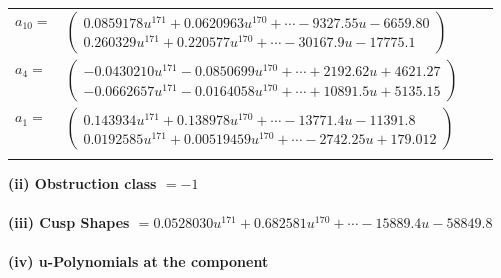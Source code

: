 \documentclass[1p]{elsarticle_modified}
\theoremstyle{definition}
\begin{document}
\begin{tabular}{m{7pt} m{180pt} m{7pt} m{180pt} }
\flushright $a_{10}=$&$\begin{pmatrix}0.0859178 u^{171}+0.0620963 u^{170}+\cdots-9327.55 u-6659.80\\0.260329 u^{171}+0.220577 u^{170}+\cdots-30167.9 u-17775.1\end{pmatrix}$ \\
\flushright $a_{4}=$&$\begin{pmatrix}-0.0430210 u^{171}-0.0850699 u^{170}+\cdots+2192.62 u+4621.27\\-0.0662657 u^{171}-0.0164058 u^{170}+\cdots+10891.5 u+5135.15\end{pmatrix}$ \\
\flushright $a_{1}=$&$\begin{pmatrix}0.143934 u^{171}+0.138978 u^{170}+\cdots-13771.4 u-11391.8\\0.0192585 u^{171}+0.00519459 u^{170}+\cdots-2742.25 u+179.012\end{pmatrix}$\\&\end{tabular}
\flushleft \textbf{(ii) Obstruction class $= -1$}\\~\\
\flushleft \textbf{(iii) Cusp Shapes $= 0.0528030 u^{171}+0.682581 u^{170}+\cdots-15889.4 u-58849.8$}\\~\\
\newpage\renewcommand{\arraystretch}{1}
\flushleft \textbf{(iv) u-Polynomials at the component}\newline \\
\end{document}
